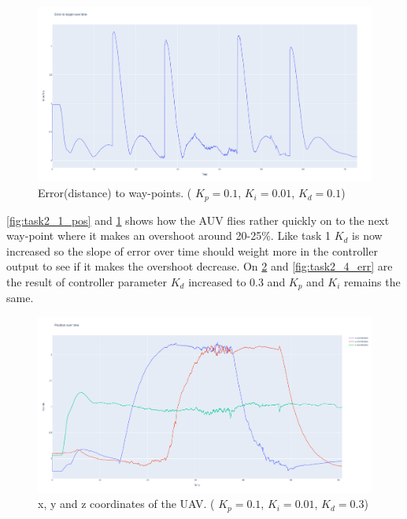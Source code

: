\documentclass[conference]{IEEEtran}
\begin{document}
\begin{figure}[hbtp]
	\centering
	\includegraphics[width=1.0\linewidth]{images/task2_1_err.png}
	\caption{Error(distance) to way-points. ( $K_p = 0.1$, $K_i = 0.01$, $K_d = 0.1$)}
	\label{fig:task2_1_err}
\end{figure}

\cref{fig:task2_1_pos} and \cref{fig:task2_1_err} shows how the AUV flies rather quickly on to the next way-point where it makes an overshoot around 20-25\%. 
Like task 1 $K_d$ is now increased so the slope of error over time should weight more in the controller output to see if it makes the overshoot decrease. On \cref{fig:task2_4_pos} and \cref{fig:task2_4_err} are the result of controller parameter $K_d$ increased to 0.3 and $K_p$ and $K_i$ remains the same. 


\begin{figure}[hbtp]
	\centering
	\includegraphics[width=1.0\linewidth]{images/task2_4_pos.png}
	\caption{x, y and z coordinates of the UAV. ( $K_p = 0.1$, $K_i = 0.01$, $K_d = 0.3$)}
	\label{fig:task2_4_pos}
\end{figure}
\end{document}
